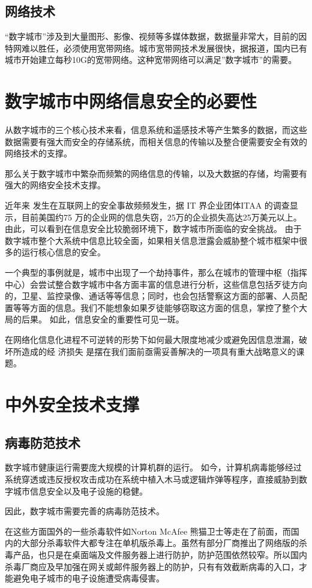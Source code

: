 \documentclass[a4paper]{ctexart}
\begin{document}
    \subsection{网络技术}
    ``数字城市''涉及到大量图形、影像、视频等多媒体数据，数据量非常大，目前的因特网难以胜任，必须使用宽带网络。城市宽带网技术发展很快，据报道，国内已有城市开始建立每秒10G的宽带网络。这种宽带网络可以满足''数字城市''的需要。

    \section{数字城市中网络信息安全的必要性}
    \par 从数字城市的三个核心技术来看，信息系统和遥感技术等产生繁多的数据，而这些数据需要有强大而安全的存储系统，而相关信息的传输以及整合便需要安全有效的网络技术的支撑。
    \par 那么关于数字城市中繁杂而频繁的网络信息的传输，以及大数据的存储，均需要有强大的网络安全技术支撑。
    \par 近年来 发生在互联网上的安全事故频频发生，据 IT 界企业团体ITAA 的调查显示，目前美国约75 万的企业网的信息失窃，25万的企业损失高达25万美元以上。 由此，可以看到在信息安全比较脆弱环境下，数字城市所面临的安全挑战。 由于数字城市整个大系统中信息比较全面，如果相关信息泄露会威胁整个城市框架中很多的运行核心信息的安全。
    \par 一个典型的事例就是，城市中出现了一个劫持事件，那么在城市的管理中枢（指挥中心）会尝试整合数字城市中各方面丰富的信息进行分析，这些信息包括歹徒方向的，卫星、监控录像、通话等等信息；同时，也会包括警察这方面的部署、人员配置等等方面的信息。我们不能想象如果歹徒能够窃取这方面的信息，掌控了整个大局的后果。 如此，信息安全的重要性可见一斑。
    \par 在网络化信息化进程不可逆转的形势下如何最大限度地减少或避免因信息泄漏，破坏所造成的经 济损失 是摆在我们面前亟需妥善解决的一项具有重大战略意义的课题。 

    \section{中外安全技术支撑}
    \subsection{病毒防范技术}
\par 数字城市健康运行需要庞大规模的计算机群的运行。 如今，计算机病毒能够经过系统穿透或违反授权攻击成功在系统中植入木马或逻辑炸弹等程序，直接威胁到数字城市信息安全以及电子设施的稳健。
\par 因此，数字城市需要完善的病毒防范技术。
\par 在这些方面国外的一些杀毒软件如Norton McAfee 熊猫卫士等走在了前面，而国内的大部分杀毒软件大都专注在单机版杀毒上。虽然有部分厂商推出了网络版的杀毒产品，也只是在桌面端及文件服务器上进行防护，防护范围依然较窄。所以国内杀毒厂商应及早加强在网关或邮件服务器上的防护，只有有效截断病毒的入口，才能避免电子城市的电子设施遭受病毒侵害。 
\end{document}
